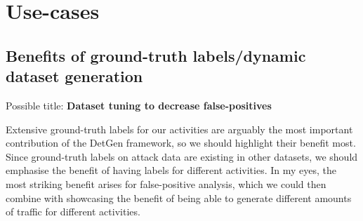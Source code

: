 \documentclass{article}
\begin{document}
%
%
%



\section{Use-cases}


\subsection{Benefits of ground-truth labels/dynamic dataset generation}
Possible title: \textbf{Dataset tuning to decrease false-positives}

Extensive ground-truth labels for our activities are arguably the most important contribution of the DetGen framework, so we should highlight their benefit most. Since ground-truth labels on attack data are existing in other datasets, we should emphasise the benefit of having labels for different activities. In my eyes, the most striking benefit arises for false-positive analysis, which we could then combine with showcasing the benefit of being able to generate different amounts of traffic for different activities.
\end{document}
